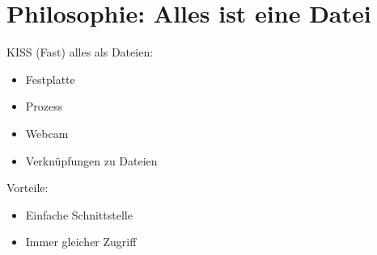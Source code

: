 \section{Philosophie: Alles ist eine Datei}
\begin{frame}{KISS}
(Fast) alles als Dateien:
\begin{itemize}
 \item Festplatte
 \item Prozess
 \item Webcam
 \item Verknüpfungen zu Dateien
\end{itemize}

Vorteile:
\begin{itemize}
 \item Einfache Schnittstelle
 \item Immer gleicher Zugriff 
\end{itemize}

\end{frame}

